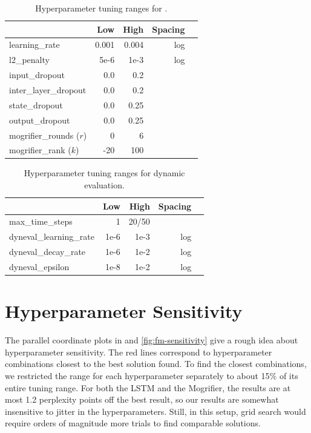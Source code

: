 \begin{subappendices}
\begin{table}[tp]
  \caption{Hyperparameter tuning ranges for \enwik.}
  \label{tab:hyperparameter-tuning-ranges-enwik}

  \centering
  \begin{tabular}{@{}lrrrr@{}}
    & Low & High & Spacing \\
    \midrule
    learning\_rate & 0.001 & 0.004 & log \\
    l2\_penalty & 5e-6 & 1e-3 & log \\
    input\_dropout & 0.0 & 0.2 & \\
    inter\_layer\_dropout & 0.0 & 0.2 & \\
    state\_dropout & 0.0 & 0.25 \\
    output\_dropout & 0.0 & 0.25 \\
    mogrifier\_rounds ($r$) & 0 & 6 \\
    mogrifier\_rank ($k$) & -20 & 100 \\
    \midrule
  \end{tabular}
\end{table}

\begin{table}[tp]
  \caption{Hyperparameter tuning ranges for dynamic evaluation.}
  \label{tab:hyperparameter-tuning-ranges-dyneval}

  \centering
  \begin{tabular}{@{}lrrrr@{}}
    & Low & High & Spacing \\
    \midrule
    max\_time\_steps & 1 & 20/50 & \\
    dyneval\_learning\_rate & 1e-6 & 1e-3 & log \\
    dyneval\_decay\_rate & 1e-6 & 1e-2 & log \\
    dyneval\_epsilon & 1e-8 & 1e-2 & log \\
    \midrule
  \end{tabular}
\end{table}

\section{Hyperparameter Sensitivity}
\label{sec:hyperparameter-sensitivity}

The parallel coordinate plots in  and
\ref{fig:fm-sensitivity} give a rough idea about hyperparameter
sensitivity.
%
The red lines correspond to hyperparameter combinations closest to the
best solution found.
%
To find the closest combinations, we restricted the range for each
hyperparameter separately to about 15\% of its entire tuning range.
%
For both the LSTM and the Mogrifier, the results are at most 1.2
perplexity points off the best result, so our results are somewhat
insensitive to jitter in the hyperparameters.
%
Still, in this setup, grid search would require orders of magnitude
more trials to find comparable solutions.


\end{subappendices}

